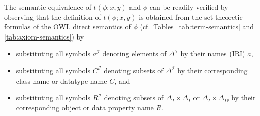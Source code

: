 \documentclass[review]{elsarticle}
\theoremstyle{definition}
\begin{document}
The semantic equivalence of $t(\phi; x, y)$ and $\phi$ can be readily
verified by observing that the definition of $t(\phi; x, y)$ is obtained from
the set-theoretic formulas of the OWL direct semantics of $\phi$
(cf.~Tables~\ref{tab:term-semantics} and \ref{tab:axiom-semantics}) by
\begin{itemize}
\item substituting all symbols $a^\mathcal{I}$ denoting elements of $\Delta^\mathcal{I}$
  by their names (IRI) $a$,
\item substituting all symbols $C^\mathcal{I}$ denoting subsets of $\Delta^\mathcal{I}$
  by their corresponding class name or datatype name $C$, and
\item substituting all symbols $R^\mathcal{I}$ denoting subsets of $\Delta_{I}\times\Delta_{I}$ or $\Delta_{I}\times\Delta_{D}$
  by their corresponding object or data property name $R$.
\end{itemize}
\end{document}
